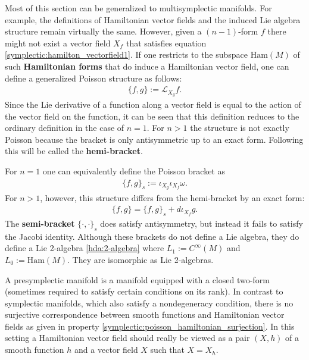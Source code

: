     \begin{remark}\label{symplectic:hamiltonian_forms}
        Most of this section can be generalized to multisymplectic manifolds. For example, the definitions of Hamiltonian vector fields and the induced Lie algebra structure remain virtually the same. However, given a $(n-1)$-form $f$ there might not exist a vector field $X_f$ that satisfies equation \ref{symplectic:hamilton_vectorfield1}. If one restricts to the subspace $\text{Ham}(M)$ of such \textbf{Hamiltonian forms} that do induce a Hamiltonian vector field, one can define a generalized Poisson structure as follows:
        \begin{gather}
            \{f, g\} := \mathcal{L}_{X_g}f.
        \end{gather}
        Since the Lie derivative of a function along a vector field is equal to the action of the vector field on the function, it can be seen that this definition reduces to the ordinary definition in the case of $n=1$. For $n>1$ the structure is not exactly Poisson because the bracket is only antisymmetric up to an exact form. Following \cite{category_symplectic} this will be called the \textbf{hemi-bracket}.

        For $n=1$ one can equivalently define the Poisson bracket as
        \begin{gather}
            \{f,g\}_s := \iota_{X_g}\iota_{X_f}\omega.
        \end{gather}
        For $n>1$, however, this structure differs from the hemi-bracket by an exact form:
        \begin{gather}
            \{f,g\} = \{f,g\}_s + d\iota_{X_f}g.
        \end{gather}
        The \textbf{semi-bracket} $\{\cdot,\cdot\}_s$ does satisfy antisymmetry, but instead it fails to satisfy the Jacobi identity. Although these brackets do not define a Lie algebra, they do define a Lie 2-algebra \ref{hda:2-algebra} where $L_1:=C^\infty(M)$ and $L_0:=\text{Ham}(M)$. They are isomorphic as Lie 2-algebras.
    \end{remark}

    \begin{remark}
        A presymplectic manifold is a manifold equipped with a closed two-form (sometimes required to satisfy certain conditions on its rank). In contrast to symplectic manifolds, which also satisfy a nondegeneracy condition, there is no surjective correspondence between smooth functions and Hamiltonian vector fields as given in property \ref{symplectic:poisson_hamiltonian_surjection}. In this setting a Hamiltonian vector field should really be viewed as a pair $(X,h)$ of a smooth function $h$ and a vector field $X$ such that $X = X_h$.
    \end{remark}

